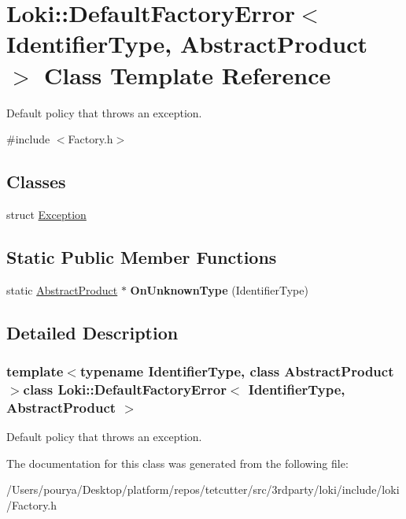 \hypertarget{structLoki_1_1DefaultFactoryError}{}\section{Loki\+:\+:Default\+Factory\+Error$<$ Identifier\+Type, Abstract\+Product $>$ Class Template Reference}
\label{structLoki_1_1DefaultFactoryError}


Default policy that throws an exception.  




{\ttfamily \#include $<$Factory.\+h$>$}

\subsection*{Classes}
\begin{DoxyCompactItemize}
\item 
struct \hyperlink{structLoki_1_1DefaultFactoryError_1_1Exception}{Exception}
\end{DoxyCompactItemize}
\subsection*{Static Public Member Functions}
\begin{DoxyCompactItemize}
\item 
\hypertarget{structLoki_1_1DefaultFactoryError_acdb953ae5a345ce4477b44240e9fb2f0}{}static \hyperlink{classAbstractProduct}{Abstract\+Product} $\ast$ {\bfseries On\+Unknown\+Type} (Identifier\+Type)\label{structLoki_1_1DefaultFactoryError_acdb953ae5a345ce4477b44240e9fb2f0}

\end{DoxyCompactItemize}


\subsection{Detailed Description}
\subsubsection*{template$<$typename Identifier\+Type, class Abstract\+Product$>$class Loki\+::\+Default\+Factory\+Error$<$ Identifier\+Type, Abstract\+Product $>$}

Default policy that throws an exception. 

The documentation for this class was generated from the following file\+:\begin{DoxyCompactItemize}
\item 
/\+Users/pourya/\+Desktop/platform/repos/tetcutter/src/3rdparty/loki/include/loki/Factory.\+h\end{DoxyCompactItemize}
